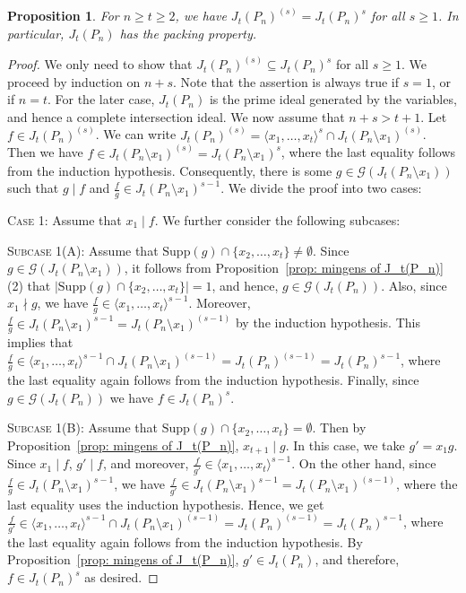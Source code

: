\documentclass[12pt]{amsart}
\newtheorem{proposition}{Proposition}[section]
\def\l{\langle}
\def\r{\rangle}
\begin{document}
\begin{proposition}\label{prop: Symbolic Prop for P_n}
    For $n\geq t\geq 2$, we have $J_t(P_n)^{(s)}= J_t(P_n)^{s}$ for all $s\geq 1$. In particular, $J_t(P_n)$ has the packing property. 
\end{proposition}
\begin{proof} 
We only need to show that $J_t(P_n)^{(s)}\subseteq J_t(P_n)^{s}$ for all $s\geq 1$. We proceed by induction on $n+s$. Note that the assertion is always true if $s=1$, or if $n=t$. For the later case, $J_t(P_n)$ is the prime ideal generated by the variables, and hence a complete intersection ideal. We now assume that $n+s>t+1$. Let $f\in J_t(P_n)^{(s)}$. We can write $J_t(P_n)^{(s)}= \l x_1,\ldots ,x_t\r^s\cap J_t(P_n\setminus x_1)^{(s)}$. Then we have $f\in J_t(P_n\setminus x_1)^{(s)}=J_t(P_n\setminus x_1)^{s}$, where the last equality follows from the induction hypothesis. Consequently, there is some $g\in \mathcal{G}(J_t(P_n\setminus x_1))$ such that $g\mid f$ and $\frac{f}{g}\in J_t(P_n\setminus x_1)^{s-1}$. We divide the proof into two cases:
	
	\noindent
	\textsc{Case 1}: Assume that $x_1\mid f$.  We further consider the following subcases:
	
	\noindent
	\textsc{Subcase 1(A)}: Assume that $\mathrm{Supp}(g)\cap \{x_2, \dots , x_t\}\neq \emptyset$. Since $g\in \mathcal{G}(J_t(P_n\setminus x_1))$, it follows from Proposition~\ref{prop: mingens of J_t(P_n)}(2) that $|\mathrm{Supp}(g)\cap \{x_2, \dots , x_t\}|=1$, and hence, $g\in \mathcal{G}(J_t(P_n))$. Also, since $x_1\nmid g$, we have $\frac{f}{g}\in \l x_1,\dots ,x_t\r^{s-1}$. Moreover, $\frac{f}{g}\in J_t(P_n\setminus x_1)^{s-1}=J_t(P_n\setminus x_1)^{(s-1)}$ by the induction hypothesis. This implies that $\frac{f}{g}\in  \l x_1, \dots ,x_t\r^{s-1}\cap J_t(P_n\setminus x_1)^{(s-1)}= J_t(P_n)^{(s-1)}=J_t(P_n)^{s-1}$, where the last equality again follows from the induction hypothesis. Finally, since $g\in \mathcal{G}(J_t(P_n))$ we have $f\in J_t(P_n)^{s}$.
	
	\noindent
	\textsc{Subcase 1(B)}: Assume that $\mathrm{Supp}(g)\cap \{x_2, \dots, x_t\}= \emptyset$. Then by Proposition~\ref{prop: mingens of J_t(P_n)}, $x_{t+1}\mid g$. In this case, we take $g'=x_1g$. Since $x_1\mid f$, $g'\mid f$, and moreover, $\frac{f}{g'}\in \l x_1,\dots , x_t\r^{s-1}$. On the other hand, since $\frac{f}{g}\in  J_t(P_n\setminus x_1)^{s-1}$, we have  $\frac{f}{g'}\in  J_t(P_n\setminus x_1)^{s-1}= J_t(P_n\setminus x_1)^{(s-1)}$, where the last equality uses the induction hypothesis. Hence, we get $\frac{f}{g'}\in \l x_1,\dots , x_t\r^{s-1}\cap J_t(P_n\setminus x_1)^{(s-1)}= J_t(P_n)^{(s-1)}= J_t(P_n)^{s-1}$, where the last equality again follows from the induction hypothesis. By Proposition~\ref{prop: mingens of J_t(P_n)}, $g'\in J_t(P_n)$, and therefore, $f\in J_t(P_n)^{s}$ as desired.
	

\end{proof}
\end{document}
